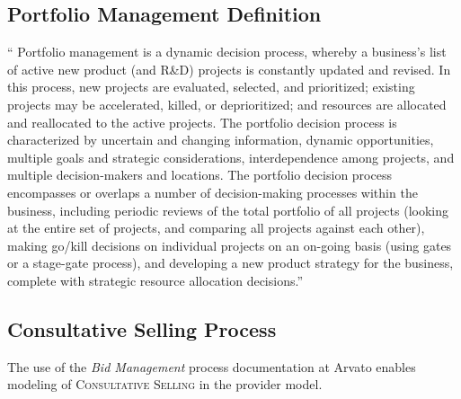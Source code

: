 \subsection{Portfolio Management Definition}
\label{app:pmdef}
\enquote{
Portfolio management is a dynamic decision process, whereby a business's list of active new product (and R\&D) projects is constantly updated and revised. In this process, new projects are evaluated, selected, and prioritized; existing projects may be accelerated, killed, or deprioritized; and resources are allocated and reallocated to the active projects. The portfolio decision process is characterized by uncertain and changing information, dynamic opportunities, multiple goals and strategic considerations, interdependence among projects, and multiple decision-makers and locations.
The portfolio decision process encompasses or overlaps a number of decision-making processes within the business, including periodic reviews of the total portfolio of all projects (looking at the entire set of projects, and comparing all projects against each other), making go/kill decisions on individual projects on an on-going basis (using gates or a stage-gate process), and developing a new product strategy for the business, complete with strategic resource allocation decisions.}  \citep[]{cooper1999new}

\subsection{Consultative Selling Process}
\label{app:salesbb}
The use of the \textit{Bid Management} process documentation at Arvato enables modeling of \textsc{Consultative Selling} in the provider model. 

